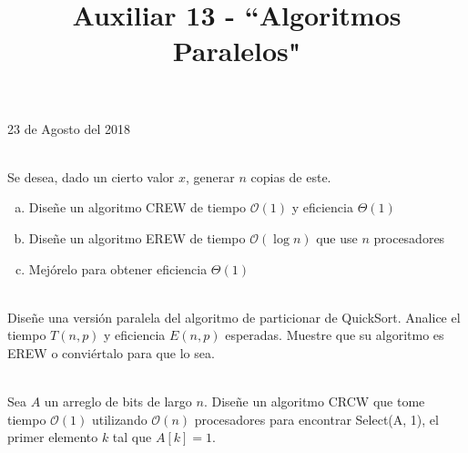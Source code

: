 \documentclass[dcc,uchile]{fcfmcourse}
\title{Auxiliar 13 - ``Algoritmos Paralelos"}
\theoremstyle{plain}
\theoremstyle{definition}
\begin{document}
\maketitle
\begin{center}
23 de Agosto del 2018
\end{center}
\vspace{-1ex}


\begin{problems}
\\
Se desea, dado un cierto valor $x$, generar $n$ copias de este.
\begin{enumerate}[a)]
    \item Diseñe un algoritmo CREW de tiempo $\mathcal{O}(1)$ y eficiencia $\Theta(1)$
    \item Diseñe un algoritmo EREW de tiempo $\mathcal{O}(\log n)$ que use $n$ procesadores
    \item Mejórelo para obtener eficiencia $\Theta(1)$
\end{enumerate}

\\
Diseñe una versión paralela del algoritmo de particionar de QuickSort. Analice el tiempo $T(n, p)$ y eficiencia $E(n, p)$ esperadas. Muestre que su algoritmo es EREW o conviértalo para que lo sea.

\\
Sea $A$ un arreglo de bits de largo $n$. Diseñe un algoritmo CRCW que tome tiempo $\mathcal{O}(1)$ utilizando $\mathcal{O}(n)$ procesadores para encontrar Select(A, 1), el primer elemento $k$ tal que $A[k] = 1$.
\end{problems}
\newpage
\end{document}
